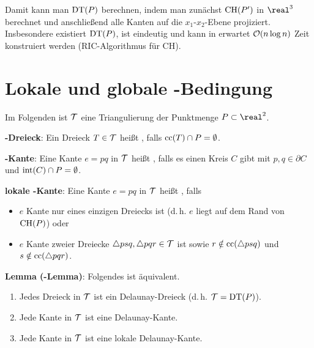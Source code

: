 Damit kann man $\operatorname{DT}(P)$ berechnen, indem man zunächst $\operatorname{CH}(P')$ in $\real^3$ berechnet
und anschließend alle Kanten auf die $x_1$-$x_2$-Ebene projiziert.
Insbesondere existiert $\operatorname{DT}(P)$, ist eindeutig
und kann in erwartet $\mathcal{O}(n \log n)$ Zeit konstruiert werden (RIC-Algorithmus für CH).

\section{%
    Lokale und globale -Bedingung%
}

Im Folgenden ist $\mathcal{T}$ eine Triangulierung der Punktmenge $P \subset \real^2$.

\textbf{-Dreieck}:
Ein Dreieck $T \in \mathcal{T}$ heißt , falls $\operatorname{cc}(T) \cap P = \emptyset$.

\textbf{-Kante}:
Eine Kante $e = pq$ in $\mathcal{T}$ heißt , falls es einen Kreis $C$ gibt
mit $p, q \in \partial C$ und $\operatorname{int}(C) \cap P = \emptyset$.

\textbf{lokale -Kante}:
Eine Kante $e = pq$ in $\mathcal{T}$ heißt , falls
\begin{itemize}
    \item
    $e$ Kante nur eines einzigen Dreiecks ist
    (d.\,h. $e$ liegt auf dem Rand von $\operatorname{CH}(P)$) oder

    \item
    $e$ Kante zweier Dreiecke $\triangle psq, \triangle pqr \in \mathcal{T}$ ist sowie
    $r \notin \operatorname{cc}(\triangle psq)$ und $s \notin \operatorname{cc}(\triangle pqr)$.
\end{itemize}

\linie

\textbf{Lemma (-Lemma)}:
Folgendes ist äquivalent.
\begin{enumerate}
    \item
    Jedes Dreieck in $\mathcal{T}$ ist ein Delaunay-Dreieck (d.\,h. $\mathcal{T} = \operatorname{DT}(P)$).

    \item
    Jede Kante in $\mathcal{T}$ ist eine Delaunay-Kante.

    \item
    Jede Kante in $\mathcal{T}$ ist eine lokale Delaunay-Kante.
\end{enumerate}

